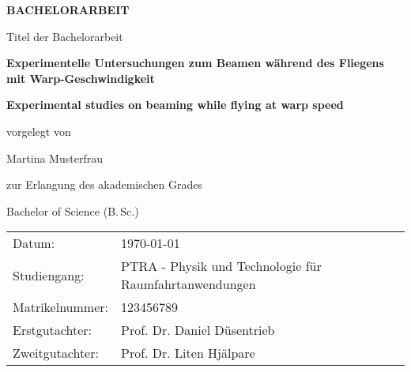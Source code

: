 {%
\pagestyle{empty}
\sffamily

\centering%

\vfill
{\bfseries\Huge BACHELORARBEIT}

\vfill
Titel der Bachelorarbeit

{\LARGE\bfseries Experimentelle Untersuchungen zum Beamen während des Fliegens mit Warp-Geschwindigkeit}
\vfill

{\Large\bfseries Experimental studies on beaming while flying at warp speed}
\vfill

vorgelegt von

{\Large Martina Musterfrau}

\vspace{15mm}

zur Erlangung des akademischen Grades

{\Large Bachelor of Science (B.\,Sc.)}
\vfill


\vspace{15mm}

\raggedright
\centering
\begin{tabular}{p{}p{}}
Datum:          & \today \\[1.0ex]
Studiengang:    &  PTRA - Physik und Technologie f\"{u}r Raumfahrtanwendungen\\[1.0ex]
Matrikelnummer: &  123456789\\[1.0ex]
Erstgutachter:  &  Prof. Dr. Daniel D\"{u}sentrieb \\[1.0ex]
Zweitgutachter: &  Prof. Dr. Liten Hj\"{a}lpare \\
\end{tabular}
\cleardoublepage
}%